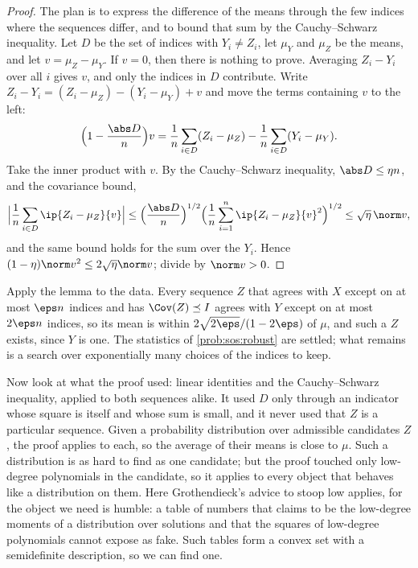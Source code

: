 \begin{refsection}

\begin{proof}
The plan is to express the difference of the means through the few indices where the sequences differ, and to bound that sum by the Cauchy--Schwarz inequality. Let $D$ be the set of indices with $Y_i\ne Z_i$, let $\mu_Y$ and $\mu_Z$ be the means, and let $v=\mu_Z-\mu_Y$. If $v=0$, then there is nothing to prove. Averaging $Z_i-Y_i$ over all $i$ gives $v$, and only the indices in $D$ contribute. Write $Z_i-Y_i=(Z_i-\mu_Z)-(Y_i-\mu_Y)+v$ and move the terms containing $v$ to the left:
\[
  \Bigl(1-\frac{\abs D}{n}\Bigr)v=\frac1n\sum_{i\in D}(Z_i-\mu_Z)-\frac1n\sum_{i\in D}(Y_i-\mu_Y).
\]
Take the inner product with $v$. By the Cauchy--Schwarz inequality, $\abs D\le\eta n$, and the covariance bound,
\[
  \Bigl|\frac1n\sum_{i\in D}\ip{Z_i-\mu_Z}{v}\Bigr|
  \le\Bigl(\frac{\abs D}{n}\Bigr)^{1/2}\Bigl(\frac1n\sum_{i=1}^n\ip{Z_i-\mu_Z}{v}^2\Bigr)^{1/2}
  \le\sqrt\eta\,\norm v,
\]
and the same bound holds for the sum over the $Y_i$. Hence $(1-\eta)\norm v^2\le2\sqrt\eta\norm v$; divide by $\norm v>0$.
\end{proof}

Apply the lemma to the data. Every sequence $Z$ that agrees with $X$ except on at most $\eps n$ indices and has $\Cov(Z)\preceq I$ agrees with $Y$ except on at most $2\eps n$ indices, so its mean is within $2\sqrt{2\eps}/(1-2\eps)$ of $\mu$, and such a $Z$ exists, since $Y$ is one. The statistics of \cref{prob:sos:robust} are settled; what remains is a search over exponentially many choices of the indices to keep.

Now look at what the proof used: linear identities and the Cauchy--Schwarz inequality, applied to both sequences alike. It used $D$ only through an indicator whose square is itself and whose sum is small, and it never used that $Z$ is a particular sequence. Given a probability distribution over admissible candidates $Z$, the proof applies to each, so the average of their means is close to $\mu$. Such a distribution is as hard to find as one candidate; but the proof touched only low-degree polynomials in the candidate, so it applies to every object that behaves like a distribution on them. Here Grothendieck's advice to stoop low applies, for the object we need is humble: a table of numbers that claims to be the low-degree moments of a distribution over solutions and that the squares of low-degree polynomials cannot expose as fake. Such tables form a convex set with a semidefinite description, so we can find one.


\end{refsection}
